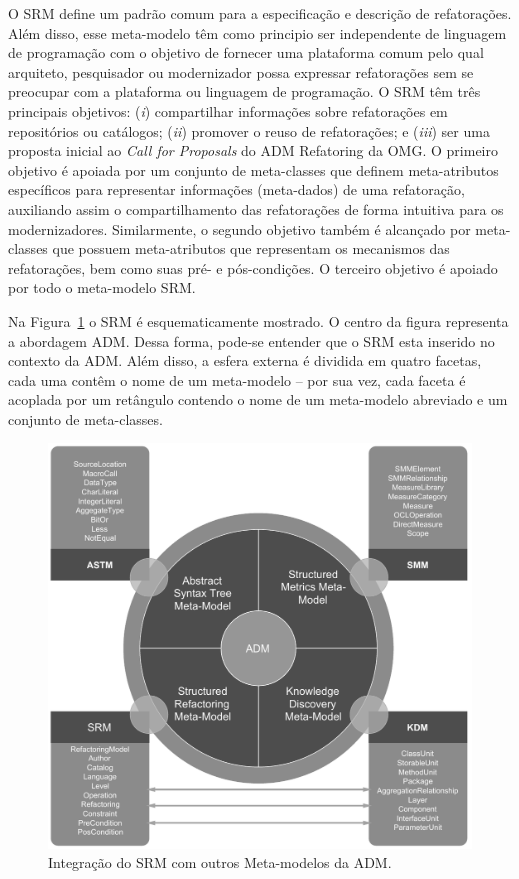 O SRM define um padrão comum para a especificação e descrição de refatorações. Além disso, esse meta-modelo têm como principio ser independente de linguagem de programação com o objetivo de fornecer uma plataforma comum pelo qual arquiteto, pesquisador ou modernizador possa expressar refatorações sem se preocupar com a plataforma ou linguagem de programação. O SRM têm três principais objetivos: (\textit{i}) compartilhar informações sobre refatorações em repositórios ou catálogos; (\textit{ii}) promover o reuso de refatorações; e (\textit{iii}) ser uma proposta inicial ao \textit{Call for Proposals} do ADM Refatoring da OMG. O primeiro objetivo é apoiada por um conjunto de meta-classes que definem meta-atributos específicos para representar informações (meta-dados) de uma refatoração, auxiliando assim o compartilhamento das refatorações de forma intuitiva para os modernizadores. Similarmente, o segundo objetivo também é alcançado por meta-classes que possuem meta-atributos que representam os mecanismos das refatorações, bem como suas pré- e pós-condições. O terceiro objetivo é apoiado por todo o meta-modelo SRM.

Na Figura~\ref{fig:refactoring_metamodel} o SRM é esquematicamente mostrado. O centro da figura representa a abordagem ADM. Dessa forma, pode-se entender que o SRM esta inserido no contexto da ADM. Além disso, a esfera externa é dividida em quatro facetas, cada uma contêm o nome de um meta-modelo – por sua vez, cada faceta é acoplada por um retângulo contendo o nome de um meta-modelo abreviado e um conjunto de meta-classes. 

\begin{figure}[h]
	\centering
	\caption{Integração do SRM com outros Meta-modelos da ADM.}
	\label{fig:refactoring_metamodel}
	\includegraphics[scale=0.65]{images/SRM2Formatted}
	\fautor
\end{figure}

